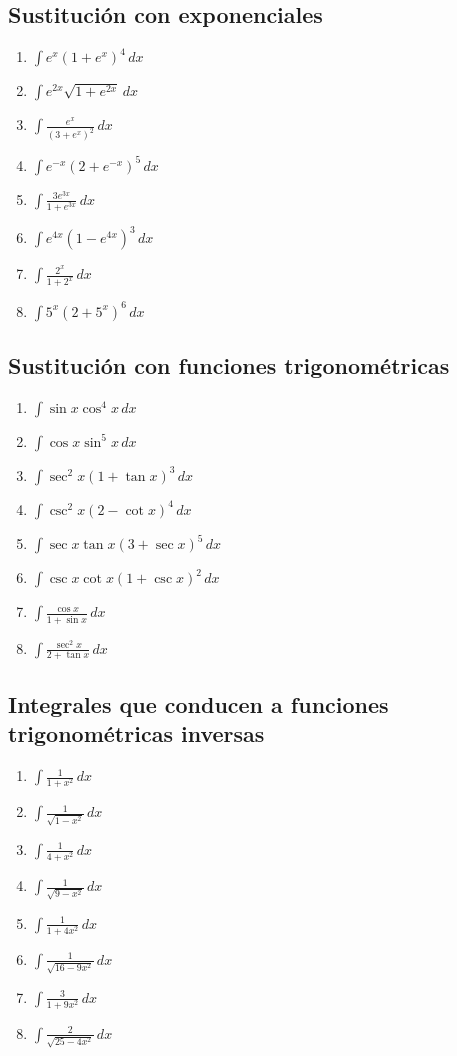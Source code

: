 \documentclass[12pt]{article}
\theoremstyle{definition}
\theoremstyle{remark}
\begin{document}
\subsection{Sustitución con exponenciales}
\begin{enumerate}[label=\arabic*.,start=89]
\item $\displaystyle \int e^x(1+e^x)^4\,dx$
\item $\displaystyle \int e^{2x}\sqrt{1+e^{2x}}\,dx$
\item $\displaystyle \int\frac{e^x}{(3+e^x)^2}\,dx$
\item $\displaystyle \int e^{-x}(2+e^{-x})^5\,dx$
\item $\displaystyle \int\frac{3e^{3x}}{1+e^{3x}}\,dx$
\item $\displaystyle \int e^{4x}(1-e^{4x})^3\,dx$
\item $\displaystyle \int\frac{2^x}{1+2^x}\,dx$
\item $\displaystyle \int 5^x(2+5^x)^6\,dx$
\end{enumerate}

\subsection{Sustitución con funciones trigonométricas}
\begin{enumerate}[label=\arabic*.,start=97]
\item $\displaystyle \int\sin x\cos^4x\,dx$
\item $\displaystyle \int\cos x\sin^5x\,dx$
\item $\displaystyle \int\sec^2x(1+\tan x)^3\,dx$
\item $\displaystyle \int\csc^2x(2-\cot x)^4\,dx$
\item $\displaystyle \int\sec x\tan x(3+\sec x)^5\,dx$
\item $\displaystyle \int\csc x\cot x(1+\csc x)^2\,dx$
\item $\displaystyle \int\frac{\cos x}{1+\sin x}\,dx$
\item $\displaystyle \int\frac{\sec^2x}{2+\tan x}\,dx$
\end{enumerate}

\subsection{Integrales que conducen a funciones trigonométricas inversas}
\begin{enumerate}[label=\arabic*.,start=105]
\item $\displaystyle \int\frac{1}{1+x^2}\,dx$
\item $\displaystyle \int\frac{1}{\sqrt{1-x^2}}\,dx$
\item $\displaystyle \int\frac{1}{4+x^2}\,dx$
\item $\displaystyle \int\frac{1}{\sqrt{9-x^2}}\,dx$
\item $\displaystyle \int\frac{1}{1+4x^2}\,dx$
\item $\displaystyle \int\frac{1}{\sqrt{16-9x^2}}\,dx$
\item $\displaystyle \int\frac{3}{1+9x^2}\,dx$
\item $\displaystyle \int\frac{2}{\sqrt{25-4x^2}}\,dx$
\end{enumerate}
\end{document}
